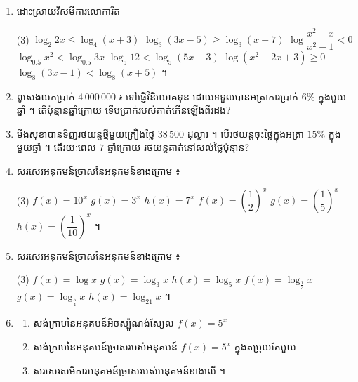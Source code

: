 \begin{enumerate}[1]
  \begin{tasks}(3)
    \task $\log_3 x = 3$
    \task $\log_x 16 = 2$
    \task $\log x + \log(x + 9) = 1$
    \task $\log_2 x = -1$
    \task $\log_9 x = \dfrac{1}{2}$
    \task $\log_8 x = \dfrac{1}{3}$
    \task $\log\sqrt[3]{x} = \sqrt{\log x}$
    \task $\log_5\sqrt{x^2 + 1} = \sqrt{1}$
    \task $\log_4(x + 3) + \log_4(x - 3) = 2$
    \task $\log\sqrt[3]{x^2} + \log\sqrt[3]{x^4} = \log 2^{-3}$ ។
  \end{tasks}
  \item ដោះស្រាយវិសមីការលោការីត
  \begin{tasks}(3)
    \task $\log_2 2x \le \log_4(x + 3)$
    \task $\log_3(3x - 5) \ge \log_3(x + 7)$
    \task $\log\dfrac{x^2 - x}{x^2 - 1} < 0$
    \task $\log_{0.5} x^2 < \log_{0.5} 3x$
    \task $\log_5 12 < \log_5(5x - 3)$
    \task $\log(x^2 - 2x + 3) \ge 0$
    \task $\log_8(3x - 1) < \log_8(x + 5)$ ។
  \end{tasks}
  \item ពូសេងយកប្រាក់ $4\,000\,000$ ៛ ទៅផ្ញើវិនិយោគទុន ដោយទទួលបានអត្រាការប្រាក់ $6\%$ ក្នុងមួយឆ្នាំ ។ តើប៉ុន្មានឆ្នាំក្រោយ ទើបប្រាក់របស់គាត់កើនឡើងពីរដង?
  \item មីងសុខាបានទិញរថយន្តថ្មីមួយគ្រឿងថ្លៃ $38\,500$ ដុល្លារ ។ បើរថយន្តចុះថ្លៃក្នុងអត្រា $15\%$ ក្នុងមួយឆ្នាំ ។ តើរយៈពេល $7$ ឆ្នាំក្រោយ រថយន្តគាត់នៅសល់ថ្លៃប៉ុន្មាន?
  \item សរសេរអនុគមន៍ច្រាសនៃអនុគមន៍ខាងក្រោម ៖
  \begin{tasks}(3)
    \task $f(x) = 10^x$
    \task $g(x) = 3^x$
    \task $h(x) = 7^x$
    \task $f(x) = \left(\dfrac{1}{2}\right)^x$
    \task $g(x) = \left(\dfrac{1}{5}\right)^x$
    \task $h(x) = \left(\dfrac{1}{10}\right)^x$ ។
  \end{tasks}
  \item សរសេរអនុគមន៍ច្រាសនៃអនុគមន៍ខាងក្រោម ៖
  \begin{tasks}(3)
    \task $f(x) = \log x$
    \task $g(x) = \log_3 x$
    \task $h(x) = \log_5 x$
    \task $f(x) = \log_{\frac{1}{3}} x$
    \task $g(x) = \log_{\frac{5}{4}} x$
    \task $h(x) = \log_{21} x$ ។
  \end{tasks}
  \item
  \begin{enumerate}[a]
    \item សង់ក្រាបនៃអនុគមន៍អិចស្ប៉ូណង់ស្យែល $f(x) = 5^x$
    \item សង់ក្រាបនៃអនុគមន៍ច្រាសរបស់អនុគមន៍ $f(x) = 5^x$ ក្នុងតម្រុយតែមួយ
    \item សរសេរសមីការអនុគមន៍ច្រាសរបស់អនុគមន៍ខាងលើ ។
  \end{enumerate}

\end{enumerate}
